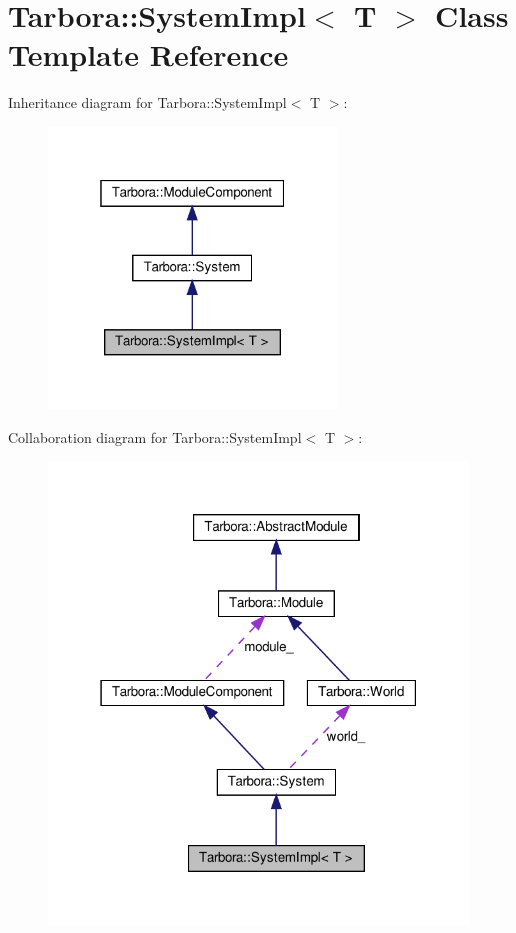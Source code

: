 \hypertarget{classTarbora_1_1SystemImpl}{}\section{Tarbora\+:\+:System\+Impl$<$ T $>$ Class Template Reference}
\label{classTarbora_1_1SystemImpl}


Inheritance diagram for Tarbora\+:\+:System\+Impl$<$ T $>$\+:
\nopagebreak
\begin{figure}[H]
\begin{center}
\leavevmode
\includegraphics[width=217pt]{classTarbora_1_1SystemImpl__inherit__graph}
\end{center}
\end{figure}


Collaboration diagram for Tarbora\+:\+:System\+Impl$<$ T $>$\+:
\nopagebreak
\begin{figure}[H]
\begin{center}
\leavevmode
\includegraphics[width=316pt]{classTarbora_1_1SystemImpl__coll__graph}
\end{center}
\end{figure}
